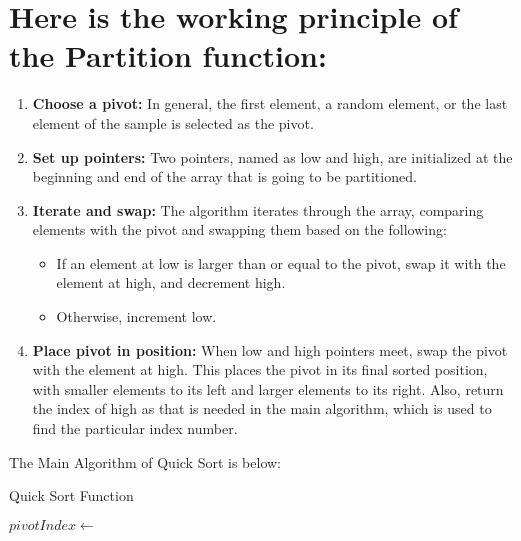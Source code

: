 \documentclass[twocolumn]{article}
\begin{document}
\section*{Here is the working principle of the Partition  function:}

\begin{enumerate}[label=\textbf{\arabic*.}, left=0pt, itemsep=0.5em]
    \item \textbf{Choose a pivot:}
    In general, the first element, a random element, or the last element of the sample is selected as the pivot.
    
    \item \textbf{Set up pointers:}
    Two pointers, named as low and high, are initialized at the beginning and end of the array that is going to be partitioned.
    
    \item \textbf{Iterate and swap:}
    The algorithm iterates through the array, comparing elements with the pivot and swapping them based on the following:
    
    \begin{itemize}
        \item If an element at low is larger than or equal to the pivot, swap it with the element at high, and decrement high.
        \item Otherwise, increment low.
    \end{itemize}
    
    \item \textbf{Place pivot in position:}
    When low and high pointers meet, swap the pivot with the element at high. This places the pivot in its final sorted position, with smaller elements to its left and larger elements to its right. Also, return the index of high as that is needed in the main algorithm, which is used to find the particular index number.
\end{enumerate}
\vspace{10pt}
The Main Algorithm of Quick Sort is below:
\begin{algorithm}
  \caption{ Quick Sort Function}
  \begin{algorithmic}[1]
          \State $pivotIndex \gets$ 
          \State {} 
          \State {} 
      \EndIf
  \EndProcedure
    \end{algorithmic}
  \end{algorithm}
  
\end{document}
